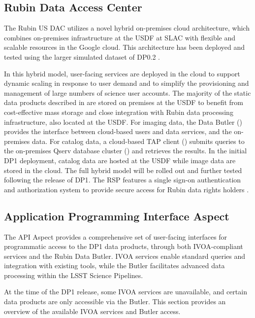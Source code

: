\subsection{Rubin Data Access Center}
\label{ssec:usdac}
The Rubin US DAC utilizes a novel hybrid on-premises \gls{cloud} architecture, which combines on-premises infrastructure at the \gls{USDF} at SLAC with flexible and scalable resources in the Google \gls{cloud}.
This architecture has been deployed and tested using the larger simulated dataset of DP0.2 \citep[][]{2024SPIE13101E..2BO}.

In this hybrid model, user-facing services are deployed in the \gls{cloud} to support dynamic scaling in response to user demand and to simplify the provisioning and management of large numbers of science user accounts.
The majority of the static data products described in  are stored on premises at the \gls{USDF} to benefit from cost-effective mass storage and close integration with Rubin data processing infrastructure, also located at the \gls{USDF}.
For imaging data, the Data Butler () provides the interface between  \gls{cloud}-based users and data services, and the on-premises data.
For catalog data, a \gls{cloud}-based \gls{TAP} client () submits queries to the on-premises \gls{Qserv} database cluster () and retrieves the results.
In the initial \gls{DP1} deployment, catalog data are hosted at the \gls{USDF} while image data are stored in the cloud.
The full hybrid model will be rolled out and further tested following the release of \gls{DP1}.
The RSP features a single sign-on authentication and authorization system to provide secure access for Rubin data rights holders \citep[][]{rdo-013}.

\subsection{Application Programming Interface Aspect}
\label{ssec:rsp_api}
The \gls{API} Aspect provides a comprehensive set of user-facing interfaces for programmatic access to the \gls{DP1} data products, through both \gls{IVOA}-compliant services and the Rubin Data Butler. IVOA services enable standard queries and integration with existing tools, while the Butler facilitates advanced data processing within the LSST Science Pipelines.

At the time of the \gls{DP1} release, some \gls{IVOA} services are unavailable, and certain data products are only accessible via the Butler.
This section provides an overview of the available \gls{IVOA} services and Butler access.

